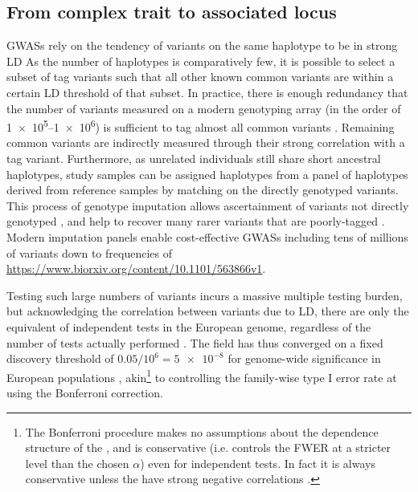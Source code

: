 \begin{outline}
\subsection{From complex trait to associated locus}

\glspl{GWAS} rely on the tendency of variants on the same haplotype to be in strong \gls{LD}
As the number of haplotypes is comparatively few, 
it is possible to select a subset of tag variants such that all other known common variants are within a certain \gls{LD} threshold of that subset. 
In practice, there is enough redundancy that the number of variants measured on a modern genotyping array (in the order of \numrange[retain-unity-mantissa=false]{1e5}{1e6}) is sufficient to tag almost all common variants  \autocite{theinternationalhapmapconsortium2005HaplotypeMapHuman,barrett2006EvaluatingCoverageGenomewide}.
Remaining common variants are indirectly measured through their strong correlation with a tag variant.
Furthermore, as unrelated individuals still share short ancestral haplotypes, 
study samples can be assigned haplotypes from a panel of haplotypes derived from reference samples by matching on the directly genotyped variants.
This process of genotype imputation allows ascertainment of variants not directly genotyped \autocite{das2018GenotypeImputationLarge},
and help to recover many rarer variants that are poorly-tagged \autocite{visscher201710YearsGWAS}.
Modern imputation panels enable cost-effective \glspl{GWAS} including tens of millions of variants down to frequencies of  \url{https://www.biorxiv.org/content/10.1101/563866v1}.

Testing such large numbers of variants incurs a massive multiple testing burden, but acknowledging the correlation between variants due to \gls{LD},
there are only the equivalent of  independent tests in the European genome, regardless of the number of tests actually performed \autocite{peer2008EstimationMultipleTesting}.
The field has thus converged on a fixed discovery threshold of $0.05 / 10^6 = \num{5e-8}$ for genome-wide significance in European populations \autocite{jannot2015108HasEmerged}, akin\footnote{
    The Bonferroni procedure makes no assumptions about the dependence structure of the \pvalues, and is conservative (i.e. controls the \gls{FWER} at a stricter level than the chosen $\alpha$) even for independent tests. In fact it is always conservative unless the \pvalues have strong negative correlations \autocite{goeman2014MultipleHypothesisTesting}.
}
to controlling the family-wise type I error rate at using the Bonferroni correction.


\end{outline}

